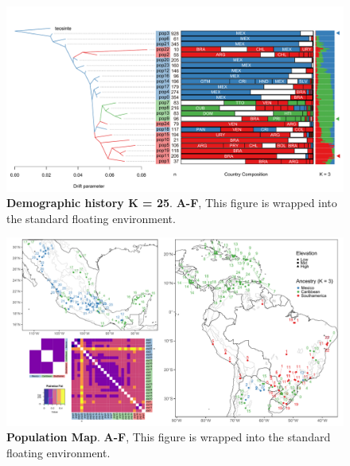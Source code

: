 \documentclass[10pt,letterpaper]{article}
\begin{document}
\begin{figure}[h] %


\includegraphics[width=\textwidth]{fig7.pdf}

\caption{\color{Gray} \textbf{Demographic history K = 25}. \textbf{A-F}, This figure is wrapped into the standard floating environment.}

\label{fig7} %

\end{figure}

\begin{figure}[h] %


\includegraphics[width=\textwidth]{fig8.pdf}

\caption{\color{Gray} \textbf{Population Map}. \textbf{A-F}, This figure is wrapped into the standard floating environment.}

\label{fig8} %

\end{figure}


\nolinenumbers

\newpage




\end{document}
